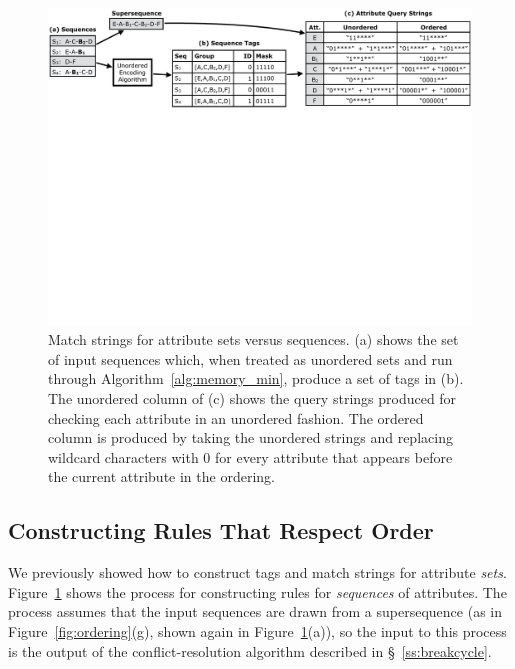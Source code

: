 \begin{figure}[t!]
\includegraphics[trim={0 18cm 0 0}, clip, width=\textwidth]{figures/ordered_match_strings}
\caption{Match strings for attribute sets versus sequences. (a) shows the set of input sequences which, when treated as unordered sets and run through Algorithm~\ref{alg:memory_min}, produce a set of tags in (b). The unordered column of (c) shows the query strings produced for checking each attribute in an unordered fashion. The ordered column is produced by taking the unordered strings and replacing wildcard characters with 0 for every attribute that appears before the current attribute in the ordering.}
\label{fig:ordered_rules}
\end{figure}


\subsection{Constructing Rules That Respect Order}
\label{s:order-rules}

We previously showed how to construct tags and match strings for attribute \emph{sets}. Figure~\ref{fig:ordered_rules} shows the process for constructing rules for \emph{sequences} of attributes. The process assumes that the input sequences are drawn from a supersequence (as in Figure~\ref{fig:ordering}(g), shown again in Figure~\ref{fig:ordered_rules}(a)), so the input to this process is the output of the conflict-resolution algorithm described in \S~\ref{ss:breakcycle}.

